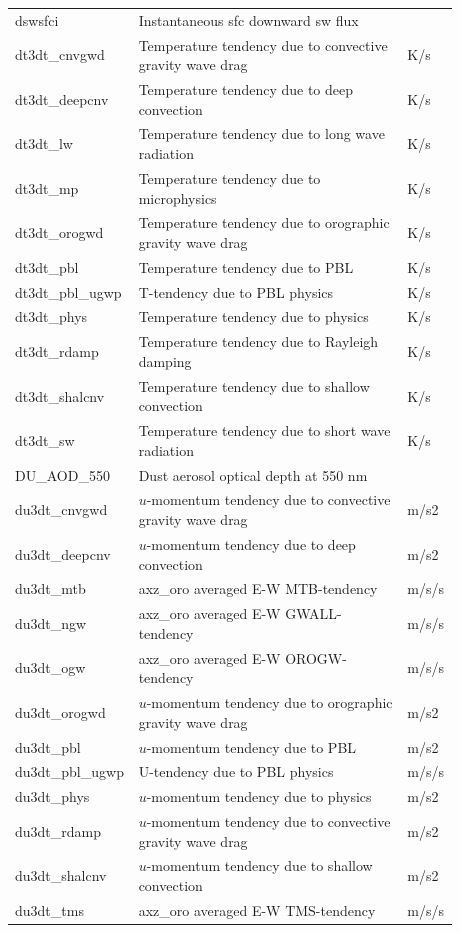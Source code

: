 \documentclass[11pt,fleqn]{report}              %
\begin{document}
\begin{enumerate}
\begin{enumerate}
{\begin{longtable}{p{0.17\linewidth} | p{0.6\linewidth} | p{0.11\linewidth} }
dswsfci  & Instantaneous sfc downward sw flux & \\ 
dt3dt\_cnvgwd & Temperature tendency due to convective gravity wave drag & K/s \\
dt3dt\_deepcnv & Temperature tendency due to deep convection & K/s \\
dt3dt\_lw & Temperature tendency due to long wave radiation & K/s \\
dt3dt\_mp & Temperature tendency due to microphysics & K/s \\
dt3dt\_orogwd & Temperature tendency due to orographic gravity wave drag & K/s \\
dt3dt\_pbl & Temperature tendency due to PBL & K/s \\
dt3dt\_pbl\_ugwp & T-tendency due to PBL physics & K/s \\
dt3dt\_phys & Temperature tendency due to physics & K/s \\
dt3dt\_rdamp & Temperature tendency due to Rayleigh damping & K/s \\
dt3dt\_shalcnv & Temperature tendency due to shallow convection & K/s \\
dt3dt\_sw & Temperature tendency due to short wave radiation & K/s \\
DU\_AOD\_550  & Dust aerosol optical depth at 550 nm & \\
du3dt\_cnvgwd & $u$-momentum tendency due to convective gravity wave drag & m/s2 \\
du3dt\_deepcnv & $u$-momentum tendency due to deep convection & m/s2 \\
du3dt\_mtb & axz\_oro averaged E-W MTB-tendency & m/s/s \\ 
du3dt\_ngw & axz\_oro averaged E-W GWALL-tendency & m/s/s \\ 
du3dt\_ogw & axz\_oro averaged E-W OROGW-tendency & m/s/s \\
du3dt\_orogwd & $u$-momentum tendency due to orographic gravity wave drag & m/s2 \\
du3dt\_pbl & $u$-momentum tendency due to PBL & m/s2 \\
du3dt\_pbl\_ugwp & U-tendency due to PBL physics & m/s/s \\
du3dt\_phys & $u$-momentum tendency due to physics & m/s2 \\
du3dt\_rdamp & $u$-momentum tendency due to convective gravity wave drag & m/s2 \\
du3dt\_shalcnv & $u$-momentum tendency due to shallow convection & m/s2 \\
du3dt\_tms & axz\_oro averaged E-W TMS-tendency & m/s/s \\ 

\end{longtable}}
\end{enumerate}
\end{enumerate}
\end{document}
